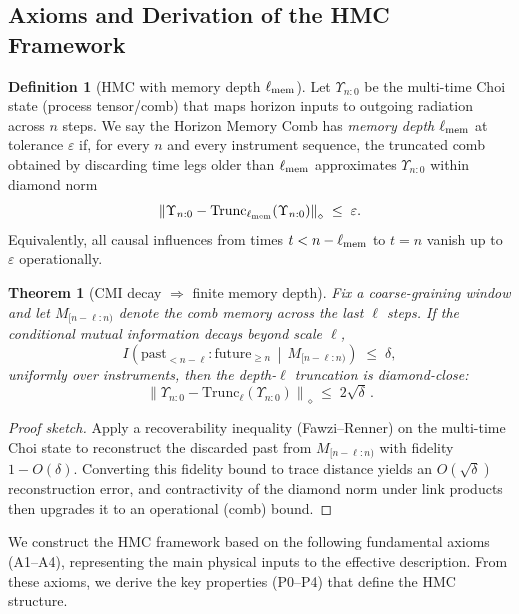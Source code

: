 \documentclass[a4paper,11pt]{article}
\newcommand{\Ddiamond}[1]{\left\|#1\right\|_\diamond}
\newcommand{\HMC}{\textup{\textsc{HMC}}\xspace}
\theoremstyle{plain}
\newtheorem{theorem}{Theorem}
\theoremstyle{definition}
\newtheorem{definition}{Definition}
\theoremstyle{remark}
\begin{document}
\subsection{Axioms and Derivation of the \HMC{} Framework}
\label{sec:assumptions}

\begin{definition}[\HMC{} with memory depth $\ell_{\rm mem}$]\label{def:hmc-memory-depth}
Let $\Upsilon_{n{:}0}$ be the multi-time Choi state (process tensor/comb) that maps horizon inputs to outgoing radiation across $n$ steps.
We say the Horizon Memory Comb has \emph{memory depth} $\ell_{\rm mem}$ at tolerance $\varepsilon$ if, for every $n$ and every instrument sequence, the truncated comb
obtained by discarding time legs older than $\ell_{\rm mem}$ approximates $\Upsilon_{n{:}0}$ within diamond norm
\[
  \Ddiamond{\Upsilon_{n{:}0}-\mathrm{Trunc}_{\ell_{\rm mem}}(\Upsilon_{n{:}0})}\;\le\;\varepsilon.
\]
Equivalently, all causal influences from times $t<n-\ell_{\rm mem}$ to $t=n$ vanish up to $\varepsilon$ operationally.
\end{definition}

\begin{theorem}[CMI decay $\Rightarrow$ finite memory depth]\label{thm:cmi-to-depth}\label{sec:cmi-bound}
Fix a coarse-graining window and let $M_{[n-\ell{:}n)}$ denote the comb memory across the last $\ell$ steps.
If the conditional mutual information decays beyond scale $\ell$,
\[
I\!\left( \text{past}_{<n-\ell} : \text{future}_{\ge n} \,\middle|\, M_{[n-\ell{:}n)} \right)\;\le\;\delta,
\]
uniformly over instruments, then the depth-$\ell$ truncation is diamond-close:
\[
\Ddiamond{\Upsilon_{n{:}0}-\mathrm{Trunc}_{\ell}(\Upsilon_{n{:}0})}\;\le\;2\sqrt{\delta}\,.
\]
\end{theorem}
\begin{proof}[Proof sketch]
Apply a recoverability inequality (Fawzi--Renner) on the multi-time Choi state to reconstruct the discarded past from $M_{[n-\ell{:}n)}$ with fidelity $1-O(\delta)$.
Converting this fidelity bound to trace distance yields an $O(\sqrt{\delta})$ reconstruction error, and contractivity of the diamond norm under link products then upgrades it to an operational (comb) bound.
\end{proof}

We construct the \HMC{} framework based on the following fundamental axioms (A1--A4), representing the main physical inputs to the effective description. From these axioms, we derive the key properties (P0--P4) that define the \HMC{} structure.
\end{document}
